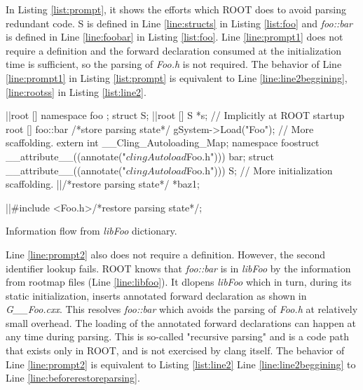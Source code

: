 \documentclass{webofc}
\begin{document}
In Listing \ref{list:prompt}, it shows the efforts which ROOT does to avoid parsing redundant code. S is defined in Line \ref{line:structs} in Listing \ref{list:foo} and {\it foo::bar} is defined in Line \ref{line:foobar} in Listing \ref{list:foo}. Line \ref{line:prompt1} does not require a definition and the forward declaration consumed at the initialization time is sufficient, so the parsing of {\it Foo.h} is not required. The behavior of Line \ref{line:prompt1} in Listing \ref{list:prompt} is equivalent to Line \ref{line:line2beggining}, \ref{line:rootss} in Listing \ref{list:line2}.

\begin{listing}[h]
    \noindent
    \begin{minipage}[h]{.7\textwidth}
    \begin{cppcode*}{}
    |\label{line:line2beggining}|root [] namespace foo { }; struct S;
    |\label{line:rootss}|root [] S *s; // Implicitly at ROOT startup
    root [] foo::bar /*store parsing state*/
    gSystem->Load("Foo");
    // More scaffolding.
    extern int __Cling_Autoloading_Map;
    namespace foo{struct __attribute__((annotate("$clingAutoload$Foo.h"))) bar;}
    struct __attribute__((annotate("$clingAutoload$Foo.h"))) S;
    // More initialization scaffolding.
    |\label{line:beforerestoreparsing}|/*restore parsing state*/ *baz1;
    
    |\label{line:restoreparsing}|#include <Foo.h>/*restore parsing state*/;
    \end{cppcode*}
    \end{minipage}
    \caption{Information flow from {\it libFoo} dictionary.}
    \label{list:line2}
\end{listing}

Line \ref{line:prompt2} also does not require a definition. However, the second identifier lookup fails. ROOT knows that {\it foo::bar} is in {\it libFoo} by the information from rootmap files (Line \ref{line:libfoo}). It dlopens {\it libFoo} which in turn, during its static initialization, inserts annotated forward declaration as shown in {\it G\_\_Foo.cxx}. This resolves {\it foo::bar} which avoids the parsing of {\it Foo.h} at relatively small overhead.
The loading of the annotated forward declarations can happen at any time during parsing. This is so-called "recursive parsing" and is a code path that exists only in ROOT, and is not exercised by clang itself. The behavior of Line \ref{line:prompt2} is equivalent to Listing \ref{list:line2} Line \ref{line:line2beggining} to Line \ref{line:beforerestoreparsing}.
\end{document}
